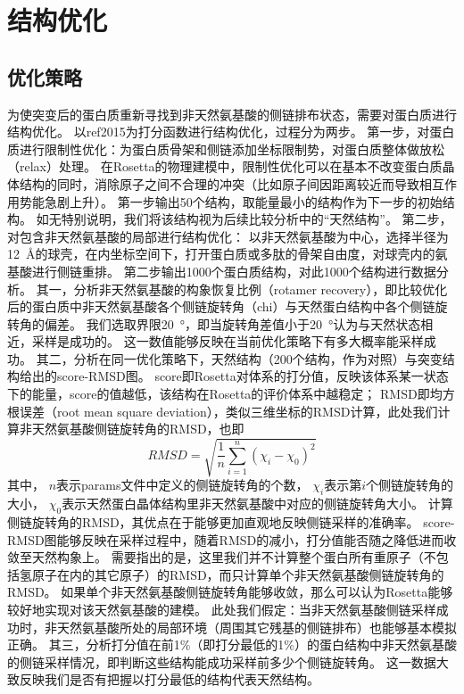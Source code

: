 \section{结构优化}

\subsection{优化策略}
为使突变后的蛋白质重新寻找到非天然氨基酸的侧链排布状态，需要对蛋白质进行结构优化。
以ref2015为打分函数\cite{RN77}进行结构优化，过程分为两步。
第一步，对蛋白质进行限制性优化：为蛋白质骨架和侧链添加坐标限制势，对蛋白质整体做放松（relax）处理。
在Rosetta的物理建模中，限制性优化可以在基本不改变蛋白质晶体结构的同时，消除原子之间不合理的冲突（比如原子间因距离较近而导致相互作用势能急剧上升）。
第一步输出50个结构，取能量最小的结构作为下一步的初始结构。
如无特别说明，我们将该结构视为后续比较分析中的“天然结构”。
第二步，对包含非天然氨基酸的局部进行结构优化：
以非天然氨基酸为中心，选择半径为\SI{12}{Å}的球壳，在内坐标空间下，打开蛋白质或多肽的骨架自由度，对球壳内的氨基酸进行侧链重排。
第二步输出1000个蛋白质结构，对此1000个结构进行数据分析。
其一，分析非天然氨基酸的构象恢复比例（rotamer recovery），即比较优化后的蛋白质中非天然氨基酸各个侧链旋转角（chi）与天然蛋白结构中各个侧链旋转角的偏差。
我们选取界限\SI{20}{°}，即当旋转角差值小于\SI{20}{°}认为与天然状态相近，采样是成功的。
这一数值能够反映在当前优化策略下有多大概率能采样成功。
其二，分析在同一优化策略下，天然结构（200个结构，作为对照）与突变结构给出的score-RMSD图。
score即Rosetta对体系的打分值，反映该体系某一状态下的能量，score的值越低，该结构在Rosetta的评价体系中越稳定；
RMSD即均方根误差（root mean square deviation），类似三维坐标的RMSD计算，此处我们计算非天然氨基酸侧链旋转角的RMSD，也即
\begin{equation}
  RMSD = \sqrt{\frac{1}{n}\sum_{i=1}^n(\chi_i - \chi_0)^2}
\end{equation}
其中，
$n$表示params文件中定义的侧链旋转角的个数，
$\chi_i$表示第$i$个侧链旋转角的大小，
$\chi_0$表示天然蛋白晶体结构里非天然氨基酸中对应的侧链旋转角大小。
计算侧链旋转角的RMSD，其优点在于能够更加直观地反映侧链采样的准确率。
score-RMSD图能够反映在采样过程中，随着RMSD的减小，打分值能否随之降低进而收敛至天然构象上\cite{RN2}。
需要指出的是，这里我们并不计算整个蛋白所有重原子（不包括氢原子在内的其它原子）的RMSD，而只计算单个非天然氨基酸侧链旋转角的RMSD。
如果单个非天然氨基酸侧链旋转角能够收敛，那么可以认为Rosetta能够较好地实现对该天然氨基酸的建模。
此处我们假定：当非天然氨基酸侧链采样成功时，非天然氨基酸所处的局部环境（周围其它残基的侧链排布）也能够基本模拟正确。
其三，分析打分值在前1\%（即打分最低的1\%）的蛋白结构中非天然氨基酸的侧链采样情况，即判断这些结构能成功采样前多少个侧链旋转角。
这一数据大致反映我们是否有把握以打分最低的结构代表天然结构。

